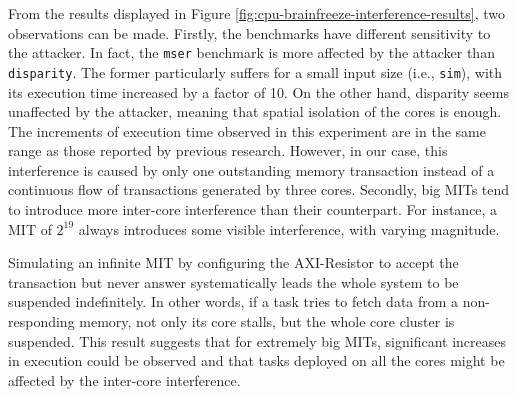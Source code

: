     From the results displayed in Figure \ref{fig:cpu-brainfreeze-interference-results}, two observations can be made.
    Firstly, the benchmarks have different sensitivity to the attacker. In fact, the \texttt{mser} benchmark is more affected by the attacker than \texttt{disparity}.
    The former particularly suffers for a small input size (i.e., \texttt{sim}), with its execution time increased by a factor of 10.
    On the other hand, disparity seems unaffected by the attacker, meaning that spatial isolation of the cores is enough.
    The increments of execution time observed in this experiment are in the same range as those reported by previous research.
    However, in our case, this interference is caused by only one outstanding memory transaction instead of a continuous flow of transactions generated by three cores.
    Secondly, big MITs tend to introduce more inter-core interference than their counterpart. For instance, a MIT of $2^{19}$ always introduces some visible interference, with varying magnitude.

    Simulating an infinite MIT by configuring the AXI-Resistor to accept the transaction but never answer systematically leads the whole system to be suspended indefinitely.
    In other words, if a task tries to fetch data from a non-responding memory, not only its core stalls, but the whole core cluster is suspended.
    This result suggests that for extremely big MITs, significant increases in execution could be observed and that tasks deployed on all the cores might be affected by the inter-core interference.
